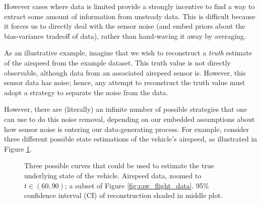However cases where data is limited provide a strongly incentive to find a way to extract some amount of information from unsteady data. This is difficult because it forces us to directly deal with the sensor noise (and embed priors about the bias-variance tradeoff of data), rather than hand-waving it away by averaging.

As an illustrative example, imagine that we wish to reconstruct a \emph{truth} estimate of the airspeed from the example dataset. This truth value is not directly observable, although data from an associated airspeed sensor is. However, this sensor data has noise; hence, any attempt to reconstruct the truth value must adopt a strategy to separate the noise from the data.

However, there are (literally) an infinite number of possible strategies that one can use to do this noise removal, depending on our embedded assumptions about how sensor noise is entering our data-generating process. For example, consider three different possible state estimations of the vehicle's airspeed, as illustrated in Figure \ref{fig:under_over_fitting}.

\begin{figure}[H]
    \centering
    \caption{Three possible curves that could be used to estimate the true underlying state of the vehicle. Airspeed data, zoomed to $t \in (60, 90)$; a subset of Figure \ref{fig:raw_flight_data}. 95\% confidence interval (CI) of reconstruction shaded in middle plot.}
    \label{fig:under_over_fitting}
\end{figure}

